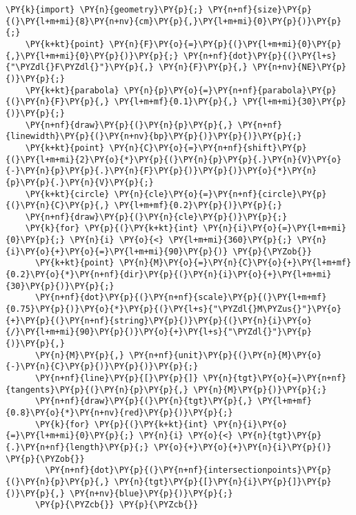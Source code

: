 \begin{Verbatim}[commandchars=\\\{\}]
    \PY{k}{import} \PY{n}{geometry}\PY{p}{;} \PY{n+nf}{size}\PY{p}{(}\PY{l+m+mi}{8}\PY{n+nv}{cm}\PY{p}{,}\PY{l+m+mi}{0}\PY{p}{)}\PY{p}{;}
    \PY{k+kt}{point} \PY{n}{F}\PY{o}{=}\PY{p}{(}\PY{l+m+mi}{0}\PY{p}{,}\PY{l+m+mi}{0}\PY{p}{)}\PY{p}{;} \PY{n+nf}{dot}\PY{p}{(}\PY{l+s}{"\PYZdl{}F\PYZdl{}"}\PY{p}{,} \PY{n}{F}\PY{p}{,} \PY{n+nv}{NE}\PY{p}{)}\PY{p}{;}
    \PY{k+kt}{parabola} \PY{n}{p}\PY{o}{=}\PY{n+nf}{parabola}\PY{p}{(}\PY{n}{F}\PY{p}{,} \PY{l+m+mf}{0.1}\PY{p}{,} \PY{l+m+mi}{30}\PY{p}{)}\PY{p}{;}
    \PY{n+nf}{draw}\PY{p}{(}\PY{n}{p}\PY{p}{,} \PY{n+nf}{linewidth}\PY{p}{(}\PY{n+nv}{bp}\PY{p}{)}\PY{p}{)}\PY{p}{;}
    \PY{k+kt}{point} \PY{n}{C}\PY{o}{=}\PY{n+nf}{shift}\PY{p}{(}\PY{l+m+mi}{2}\PY{o}{*}\PY{p}{(}\PY{n}{p}\PY{p}{.}\PY{n}{V}\PY{o}{-}\PY{n}{p}\PY{p}{.}\PY{n}{F}\PY{p}{)}\PY{p}{)}\PY{o}{*}\PY{n}{p}\PY{p}{.}\PY{n}{V}\PY{p}{;}
    \PY{k+kt}{circle} \PY{n}{cle}\PY{o}{=}\PY{n+nf}{circle}\PY{p}{(}\PY{n}{C}\PY{p}{,} \PY{l+m+mf}{0.2}\PY{p}{)}\PY{p}{;}
    \PY{n+nf}{draw}\PY{p}{(}\PY{n}{cle}\PY{p}{)}\PY{p}{;}
    \PY{k}{for} \PY{p}{(}\PY{k+kt}{int} \PY{n}{i}\PY{o}{=}\PY{l+m+mi}{0}\PY{p}{;} \PY{n}{i} \PY{o}{<} \PY{l+m+mi}{360}\PY{p}{;} \PY{n}{i}\PY{o}{+}\PY{o}{=}\PY{l+m+mi}{90}\PY{p}{)} \PY{p}{\PYZob{}}
      \PY{k+kt}{point} \PY{n}{M}\PY{o}{=}\PY{n}{C}\PY{o}{+}\PY{l+m+mf}{0.2}\PY{o}{*}\PY{n+nf}{dir}\PY{p}{(}\PY{n}{i}\PY{o}{+}\PY{l+m+mi}{30}\PY{p}{)}\PY{p}{;}
      \PY{n+nf}{dot}\PY{p}{(}\PY{n+nf}{scale}\PY{p}{(}\PY{l+m+mf}{0.75}\PY{p}{)}\PY{o}{*}\PY{p}{(}\PY{l+s}{"\PYZdl{}M\PYZus{}"}\PY{o}{+}\PY{p}{(}\PY{n+nf}{string}\PY{p}{)}\PY{p}{(}\PY{n}{i}\PY{o}{/}\PY{l+m+mi}{90}\PY{p}{)}\PY{o}{+}\PY{l+s}{"\PYZdl{}"}\PY{p}{)}\PY{p}{,}
      \PY{n}{M}\PY{p}{,} \PY{n+nf}{unit}\PY{p}{(}\PY{n}{M}\PY{o}{-}\PY{n}{C}\PY{p}{)}\PY{p}{)}\PY{p}{;}
      \PY{n+nf}{line}\PY{p}{[}\PY{p}{]} \PY{n}{tgt}\PY{o}{=}\PY{n+nf}{tangents}\PY{p}{(}\PY{n}{p}\PY{p}{,} \PY{n}{M}\PY{p}{)}\PY{p}{;}
      \PY{n+nf}{draw}\PY{p}{(}\PY{n}{tgt}\PY{p}{,} \PY{l+m+mf}{0.8}\PY{o}{*}\PY{n+nv}{red}\PY{p}{)}\PY{p}{;}
      \PY{k}{for} \PY{p}{(}\PY{k+kt}{int} \PY{n}{i}\PY{o}{=}\PY{l+m+mi}{0}\PY{p}{;} \PY{n}{i} \PY{o}{<} \PY{n}{tgt}\PY{p}{.}\PY{n+nf}{length}\PY{p}{;} \PY{o}{+}\PY{o}{+}\PY{n}{i}\PY{p}{)} \PY{p}{\PYZob{}}
        \PY{n+nf}{dot}\PY{p}{(}\PY{n+nf}{intersectionpoints}\PY{p}{(}\PY{n}{p}\PY{p}{,} \PY{n}{tgt}\PY{p}{[}\PY{n}{i}\PY{p}{]}\PY{p}{)}\PY{p}{,} \PY{n+nv}{blue}\PY{p}{)}\PY{p}{;}
      \PY{p}{\PYZcb{}} \PY{p}{\PYZcb{}}
\end{Verbatim}
